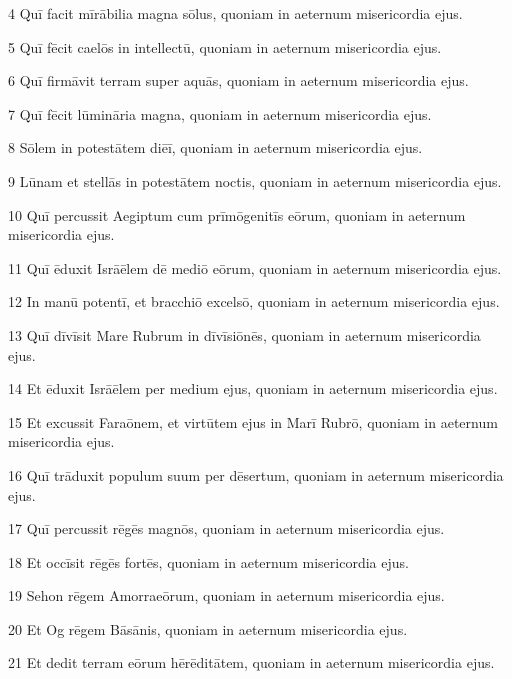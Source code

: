 \psalmVerse
  {\phantom{00}4}
  {Quī facit mīrābilia magna sōlus, quoniam in aeternum misericordia ejus.}


\psalmVerse
  {\phantom{00}5}
  {Quī fēcit caelōs in intellectū, quoniam in aeternum misericordia ejus.}


\psalmVerse
  {\phantom{00}6}
  {Quī firmāvit terram super aquās, quoniam in aeternum misericordia ejus.}


\psalmVerse
  {\phantom{00}7}
  {Quī fēcit lūmināria magna, quoniam in aeternum misericordia ejus.}


\psalmVerse
  {\phantom{00}8}
  {Sōlem in potestātem diēī, quoniam in aeternum misericordia ejus.}


\psalmVerse
  {\phantom{00}9}
  {Lūnam et stellās in potestātem noctis, quoniam in aeternum misericordia ejus.}


\psalmVerse
  {\phantom{0}10}
  {Quī percussit Aegiptum cum prīmōgenitīs eōrum, quoniam in aeternum misericordia ejus.}


\psalmVerse
  {\phantom{0}11}
  {Quī ēduxit Isrāēlem dē mediō eōrum, quoniam in aeternum misericordia ejus.}


\psalmVerse
  {\phantom{0}12}
  {In manū potentī, et bracchiō excelsō, quoniam in aeternum misericordia ejus.}


\psalmVerse
  {\phantom{0}13}
  {Quī dīvīsit Mare Rubrum in dīvīsiōnēs, quoniam in aeternum misericordia ejus.}


\psalmVerse
  {\phantom{0}14}
  {Et ēduxit Isrāēlem per medium ejus, quoniam in aeternum misericordia ejus.}


\psalmVerse
  {\phantom{0}15}
  {Et excussit Faraōnem, et virtūtem ejus in Marī Rubrō, quoniam in aeternum misericordia ejus.}


\psalmVerse
  {\phantom{0}16}
  {Quī trāduxit populum suum per dēsertum, quoniam in aeternum misericordia ejus.}


\psalmVerse
  {\phantom{0}17}
  {Quī percussit rēgēs magnōs, quoniam in aeternum misericordia ejus.}


\psalmVerse
  {\phantom{0}18}
  {Et occīsit rēgēs fortēs, quoniam in aeternum misericordia ejus.}


\psalmVerse
  {\phantom{0}19}
  {Sehon rēgem Amorraeōrum, quoniam in aeternum misericordia ejus.}


\psalmVerse
  {\phantom{0}20}
  {Et Og rēgem Bāsānis, quoniam in aeternum misericordia ejus.}


\psalmVerse
  {\phantom{0}21}
  {Et dedit terram eōrum hērēditātem, quoniam in aeternum misericordia ejus.}


